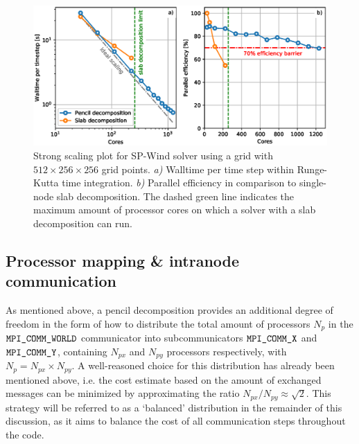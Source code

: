 \begin{figure}
	\includegraphics[width=\textwidth]{figures/meth_strong_scaling.eps}
	\caption[Strong scaling plot for SP-Wind solver using a grid with $512 \times 256 \times 256$ grid points.]{Strong scaling plot for SP-Wind solver using a grid with $512 \times 256 \times 256$ grid points. \emph{a)} Walltime per time step within Runge-Kutta time integration. \emph{b)} Parallel efficiency in comparison to single-node slab decomposition. The dashed green line indicates the maximum amount of processor cores on which a solver with a slab decomposition can run.\label{fig:strongscaling}}
\end{figure}

\subsection{Processor mapping \& intranode communication}\label{sec:meth_par_map}

As mentioned above, a pencil decomposition provides an additional degree of freedom in the form of how to distribute the total amount of processors $N_p$ in the $\verb|MPI_COMM_WORLD|$ communicator into subcommunicators $\verb|MPI_COMM_X|$ and $\verb|MPI_COMM_Y|$, containing $N_{px}$ and $N_{py}$ processors respectively, with $N_p = N_{px} \times N_{py}$. A well-reasoned choice for this distribution has already been mentioned above, i.e. the cost estimate based on the amount of exchanged messages can be minimized by approximating the ratio $N_{px}/N_{py} \approx \sqrt{2}$. This strategy will be referred to as a `balanced' distribution in the remainder of this discussion, as it aims to balance the cost of all communication steps throughout the code. 

